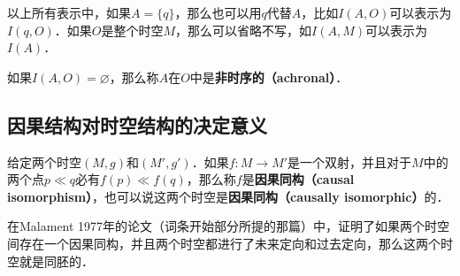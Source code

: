 以上所有表示中，如果$A=\{q\}$，那么也可以用$q$代替$A$，比如$I(A, O)$可以表示为$I(q, O)$．如果$O$是整个时空$M$，那么可以省略不写，如$I(A, M)$可以表示为$I(A)$．

如果$I(A, O)=\varnothing$，那么称$A$在$O$中是\textbf{非时序的（achronal）}．

\subsection{因果结构对时空结构的决定意义}

给定两个时空$(M, g)$和$(M', g')$．如果$f:M\rightarrow M'$是一个双射，并且对于$M$中的两个点$p\ll q$必有$f(p)\ll f(q)$，那么称$f$是\textbf{因果同构（causal isomorphism）}，也可以说这两个时空是\textbf{因果同构（causally isomorphic）}的．

在Malament 1977年的论文（词条开始部分所提的那篇）中，证明了如果两个时空间存在一个因果同构，并且两个时空都进行了未来定向和过去定向，那么这两个时空就是同胚的．







